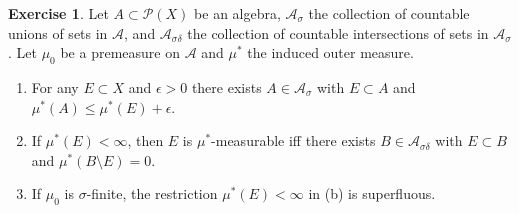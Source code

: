 \documentclass{article}
\theoremstyle{definition}
\newtheorem{ex}{Exercise}
\begin{document}
\begin{ex}
	Let $A \subset \mathscr{P}(X)$ be an algebra, $\mathscr{A}_\sigma$ the collection of countable unions of sets in $\mathscr{A}$, and $\mathscr{A}_{\sigma\delta}$ the collection of countable intersections of sets in $\mathscr{A}_\sigma$.
	Let $\mu_0$ be a premeasure on $\mathscr{A}$ and $\mu^*$ the induced outer measure.
	\begin{enumerate}[label=\textbf{\alph*.}]
		\item For any $E \subset X$ and $\epsilon > 0$ there exists $A \in \mathscr{A}_\sigma$ with $E \subset A$ and $\mu^*(A) \leq \mu^*(E) + \epsilon$.
		\item If $\mu^*(E) < \infty$, then $E$ is $\mu^*$-measurable iff there exists $B \in \mathscr{A}_{\sigma\delta}$ with $E \subset B$ and $\mu^*(B \setminus E) = 0$.
		\item If $\mu_0$ is $\sigma$-finite, the restriction $\mu^*(E) < \infty$ in (b) is superfluous.
	\end{enumerate}
\end{ex}
\end{document}
